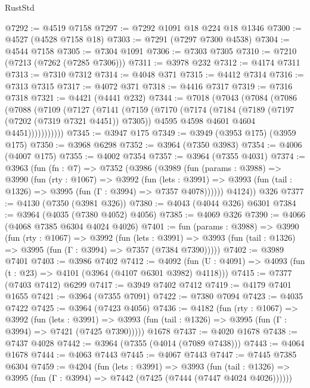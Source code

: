 \begin{lexlean}{RustStd}
\begin{coremodule}
{\begin{coremodule}
{{{{{{{{{{{{{{{{{{{{{{{{{{{{{{{{{{{{{{@7292 := @4519 @7158
@7297 := @7292 @1091 @18 @224 @18 @1346
@7300 := @4527 (@4528 @7158 @18)
@7303 := @7291 (@7297 @7300 @4538)
@7304 := @4544 @7158
@7305 := @7304 @1091
@7306 := @7303 @7305
@7310 := @7210 (@7213 (@7262 (@7285 @7306)))
@7311 := @3978 @232
@7312 := @4174 @7311
@7313 := @7310 @7312
@7314 := @4048 @371
@7315 := @4412 @7314
@7316 := @7313 @7315
@7317 := @4072 @371
@7318 := @4416 @7317
@7319 := @7316 @7318
@7321 := @4421 (@4441 @232)
@7344 := @7018
    (@7043
      (@7084
        (@7086
          (@7088
            (@7109
              (@7127
                (@7141
                  (@7159
                    (@7170
                      (@7174
                        (@7184
                          (@7189 (@7197 (@7202 (@7319 @7321 @4451)) @7305))
                          @4595
                          @4598
                          @4601
                          @4604
                          @4451)))))))))))
@7345 := @3947 @175
@7349 := @3949 (@3953 @175) (@3959 @175)
@7350 := @3968 @6298
@7352 := @3964 (@7350 @3983)
@7354 := @4006 (@4007 @175)
@7355 := @4002 @7354
@7357 := @3964 (@7355 @4031)
@7374 := @3963
    (fun (fn : @7) =>
    @7352
      (@3986
        (@3989
          (fun (params : @3988) =>
          @3990
            (fun (rty : @1067) =>
            @3992
              (fun (lets : @3991) =>
              @3993 (fun (tail : @1326) => @3995 (fun (Γ : @3994) => @7357 @4078))))))
        @4124))
    @326
@7377 := @4130 (@7350 (@3981 @326))
@7380 := @4043 (@4044 @326) @6301
@7384 := @3964 (@4035 (@7380 @4052) @4056)
@7385 := @4069 @326
@7390 := @4066 (@4068 @7385 @6304 @4024 @4026)
@7401 := fun (params : @3988) =>
  @3990
    (fun (rty : @1067) =>
    @3992
      (fun (lets : @3991) =>
      @3993 (fun (tail : @1326) => @3995 (fun (Γ : @3994) => @7357 (@7384 @7390)))))
@7402 := @3989 @7401
@7403 := @3986 @7402
@7412 := @4092 (fun (U : @4091) => @4093 (fun (t : @23) => @4101 (@3964 (@4107 @6301 @3982) @4118)))
@7415 := @7377 (@7403 @7412) @6299
@7417 := @3949 @7402 @7412
@7419 := @4179 @7401 @1655
@7421 := @3964 (@7355 @7091)
@7422 := @7380 @7094
@7423 := @4035 @7422
@7425 := @3964 (@7423 @4056)
@7436 := @4182
    (fun (rty : @1067) =>
    @3992
      (fun (lets : @3991) =>
      @3993 (fun (tail : @1326) => @3995 (fun (Γ : @3994) => @7421 (@7425 @7390)))))
    @1678
@7437 := @4020 @1678
@7438 := @7437 @4028
@7442 := @3964 (@7355 (@4014 (@7089 @7438)))
@7443 := @4064 @1678
@7444 := @4063 @7443
@7445 := @4067 @7443
@7447 := @7445 @7385 @6304
@7459 := @4204
    (fun (lets : @3991) =>
    @3993
      (fun (tail : @1326) => @3995 (fun (Γ : @3994) => @7442 (@7425 (@7444 (@7447 @4024 @4026))))))
}}}}}}}}}}}}}}}}}}}}}}}}}}}}}}}}}}}}}}
\end{coremodule}}
\end{coremodule}
\end{lexlean}
